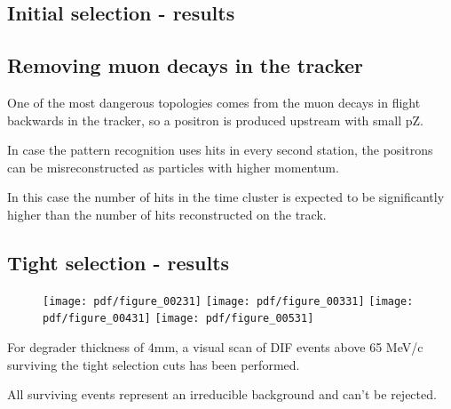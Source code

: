 \subsection{Initial selection - results}




\subsection{Removing muon decays in the tracker}

One of the most dangerous topologies comes from the muon decays in flight backwards in the tracker,
so a positron is produced upstream with small pZ.

In case the pattern recognition uses hits in every second station, the positrons can be misreconstructed
as particles with higher momentum.

In this case the number of hits in the time cluster is expected to be significantly higher
than the number of hits reconstructed on the track.

\subsection{Tight selection - results}


\begin{figure}[H]
  \texttt{[image: pdf/figure\_00231]}
  \texttt{[image: pdf/figure\_00331]}
  \texttt{[image: pdf/figure\_00431]}
  \texttt{[image: pdf/figure\_00531]}
  \caption{
    \label{fig:deg_3mm_mom}
  }
\end{figure}

For degrader thickness of 4mm, a visual scan of DIF events above 65 MeV/c surviving
the tight selection cuts has been performed.

All surviving events represent an irreducible background and can't be rejected.

